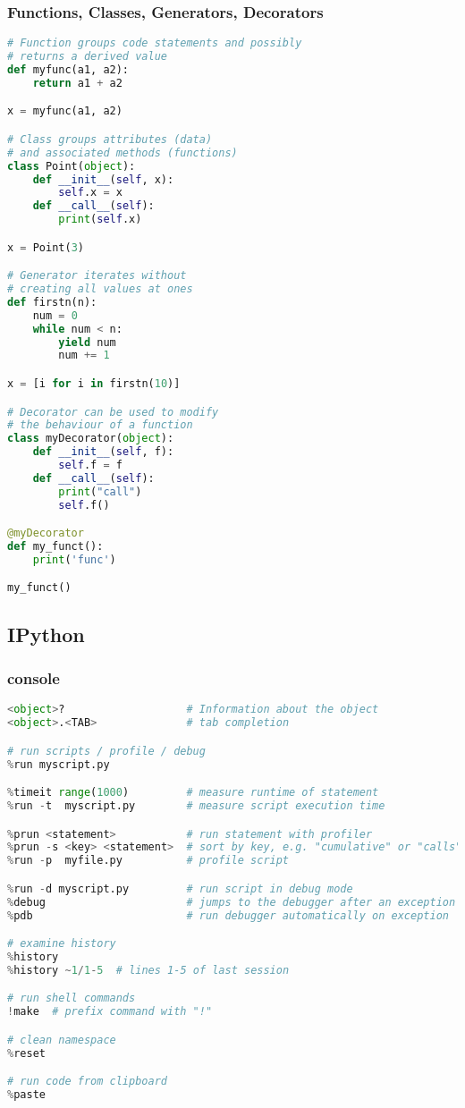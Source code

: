 \documentclass[]{article}
\begin{document}
\subsubsection{Functions, Classes, Generators,
Decorators}\label{functions-classes-generators-decorators}

\begin{lstlisting}[language=Python]
# Function groups code statements and possibly
# returns a derived value
def myfunc(a1, a2):
    return a1 + a2

x = myfunc(a1, a2)

# Class groups attributes (data)
# and associated methods (functions)
class Point(object):
    def __init__(self, x):
        self.x = x
    def __call__(self):
        print(self.x)

x = Point(3)

# Generator iterates without
# creating all values at ones
def firstn(n):
    num = 0
    while num < n:
        yield num
        num += 1

x = [i for i in firstn(10)]

# Decorator can be used to modify
# the behaviour of a function
class myDecorator(object):
    def __init__(self, f):
        self.f = f
    def __call__(self):
        print("call")
        self.f()

@myDecorator
def my_funct():
    print('func')

my_funct()
\end{lstlisting}

\subsection{IPython}\label{ipython}

\subsubsection{console}\label{console}

\begin{lstlisting}[language=Python]
<object>?                   # Information about the object
<object>.<TAB>              # tab completion

# run scripts / profile / debug
%run myscript.py

%timeit range(1000)         # measure runtime of statement
%run -t  myscript.py        # measure script execution time

%prun <statement>           # run statement with profiler
%prun -s <key> <statement>  # sort by key, e.g. "cumulative" or "calls"
%run -p  myfile.py          # profile script

%run -d myscript.py         # run script in debug mode
%debug                      # jumps to the debugger after an exception
%pdb                        # run debugger automatically on exception

# examine history
%history
%history ~1/1-5  # lines 1-5 of last session

# run shell commands
!make  # prefix command with "!"

# clean namespace
%reset

# run code from clipboard
%paste
\end{lstlisting}
\end{document}
